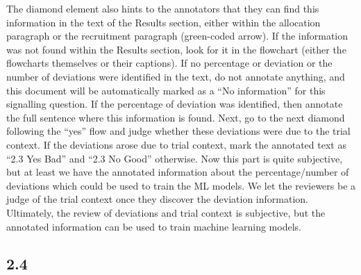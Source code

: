 \documentclass[sn-mathphys,Numbered]{sn-jnl}%
\begin{document}
The diamond element also hints to the annotators that they can find this information in the text of the Results section, either within the allocation paragraph or the recruitment paragraph (green-coded arrow).
If the information was not found within the Results section, look for it in the flowchart (either the flowcharts themselves or their captions).
If no percentage or deviation or the number of deviations were identified in the text, do not annotate anything, and this document will be automatically marked as a ``No information'' for this signalling question.
If the percentage of deviation was identified, then annotate the full sentence where this information is found.
Next, go to the next diamond following the ``yes'' flow and judge whether these deviations were due to the trial context.
If the deviations arose due to trial context, mark the annotated text as ``2.3 Yes Bad'' and ``2.3 No Good'' otherwise.
Now this part is quite subjective, but at least we have the annotated information about the percentage/number of deviations which could be used to train the ML models.
We let the reviewers be a judge of the trial context once they discover the deviation information.
Ultimately, the review of deviations and trial context is subjective, but the annotated information can be used to train machine learning models.
%
%
%
\subsection{2.4}
%
%
%

\end{document}
